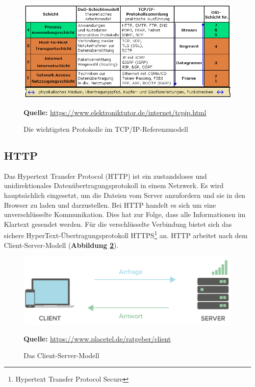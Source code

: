 \begin{figure}[H]
  \begin{center}
    \includegraphics[scale=0.5]{img/tcp.png}
	\caption{Die wichtigsten Protokolle im TCP/IP-Referenzmodell}
	\footnotesize\sffamily\textbf{Quelle:} \url{https://www.elektroniktutor.de/internet/tcpip.html} 
	\label{fig:tcp}
  \end{center}   
\end{figure}

\newpage
\subsection{HTTP}
\label{sec:http}
Das Hypertext Transfer Protocol (HTTP) ist ein zustandsloses und unidirektionales Datenübertragungsprotokoll in einem Netzwerk. Es wird hauptsächlich eingesetzt, um die Dateien vom Server anzufordern und sie in den Browser zu laden und darzustellen. Bei HTTP handelt es sich um eine unverschlüsselte Kommunikation. Dies hat zur Folge, dass alle Informationen im Klartext gesendet werden. Für die verschlüsselte Verbindung bietet sich das sichere HyperText-Übertragungsprotokoll HTTPS\footnote{Hypertext Transfer Protocol Secure} an. HTTP arbeitet nach dem Client-Server-Modell (\textbf {Abbildung \ref{fig:client-server-modell}}). 

\begin{figure}[H]
  \begin{center}
    \includegraphics[scale=0.4]{img/client-server-modell.png}
	\caption{Das Client-Server-Modell}
	\footnotesize\sffamily\textbf{Quelle:} \url{https://www.placetel.de/ratgeber/client} 
	\label{fig:client-server-modell}
  \end{center}   
\end{figure}

